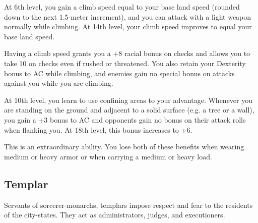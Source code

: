 {
	At 6th level, you gain a climb speed equal to \onehalf your base land speed (rounded down to the next 1.5-meter increment), and you can attack with a light weapon normally while climbing. At 14th level, your climb speed improves to equal your base land speed.

	Having a climb speed grants you a +8 racial bonus on  checks and allows you to take 10 on  checks even if rushed or threatened. You also retain your Dexterity bonus to AC while climbing, and enemies gain no special bonus on attacks against you while you are climbing.

	At 10th level, you learn to use confining areas to your advantage. Whenever you are standing on the ground and adjacent to a solid surface (e.g. a tree or a wall), you gain a +3 bonus to AC and opponents gain no bonus on their attack rolls when flanking you. At 18th level, this bonus increases to +6.

	This is an extraordinary ability. You lose both of these benefits when wearing medium or heavy armor or when carrying a medium or heavy load.
}

\subsection{Templar}
Servants of sorcerer-monarchs, templars impose respect and fear to the residents of the city-states. They act as administrators, judges, and executioners.

